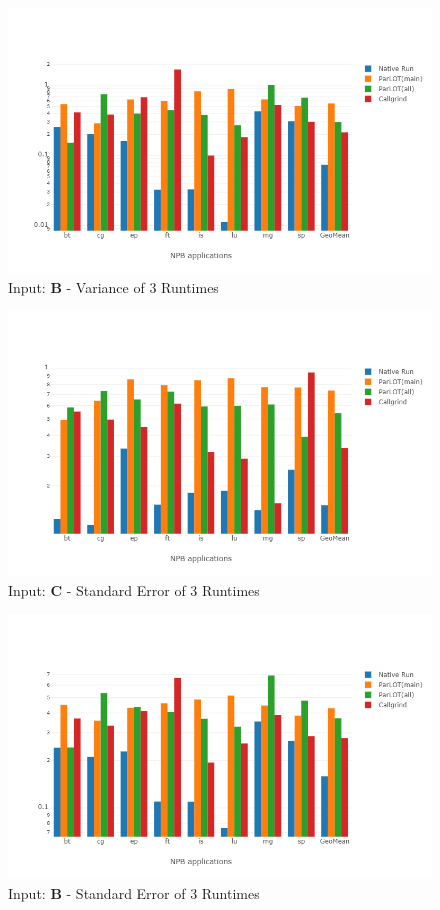 \begin{figure}[!t]
\centering
\includegraphics[width=6in]{figs.comet/comet_chartAvg_var_B_p3_5.png}
\caption{ Input: \textbf{B}  - Variance of 3 Runtimes
}
\label{comet_chartAvg_var_B_p3_5}
\end{figure}









\begin{figure}[!t]
\centering
\includegraphics[width=6in]{figs.comet/comet_chartAvg_serr_C_p3_5.png}
\caption{ Input: \textbf{C}  - Standard Error of 3 Runtimes
}
\label{comet_chartAvg_serr_C_p3_5}
\end{figure}



\begin{figure}[!t]
\centering
\includegraphics[width=6in]{figs.comet/comet_chartAvg_serr_B_p3_5.png}
\caption{ Input: \textbf{B}  - Standard Error of 3 Runtimes
}
\label{comet_chartAvg_serr_B_p3_5}
\end{figure}



